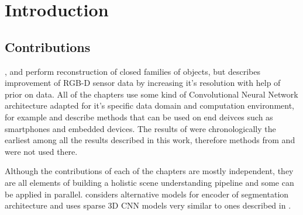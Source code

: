 \chapter{Introduction}







\section{Contributions}

,  and  perform reconstruction of closed families of objects, but  describes improvement of RGB-D sensor data by increasing it's resolution with help of prior on data.
All of the chapters use some kind of Convolutional Neural Network architecture adapted for it's specific data domain and computation environment, for example  and  describe methods that can be used on end deivces such as smartphones and embedded devices.
The results of  were chronologically the earliest among all the results described in this work, therefore methods from  and  were not used there.

Although the contributions of each of the chapters are mostly independent, they are all elements of building a holistic scene understanding pipeline and some can be applied in parallel. 
 considers alternative models for encoder of segmentation architecture and uses sparse 3D CNN models very similar to ones described in .